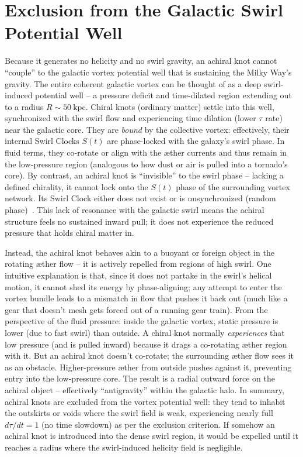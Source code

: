 \section*{Exclusion from the Galactic Swirl Potential Well}

Because it generates no helicity and no swirl gravity, an achiral knot cannot “couple” to the galactic vortex potential well that is sustaining the Milky Way’s gravity. The entire coherent galactic vortex can be thought of as a deep swirl-induced potential well – a pressure deficit and time-dilated region extending out to a radius $R \sim 50~\text{kpc}$. Chiral knots (ordinary matter) settle into this well, synchronized with the swirl flow and experiencing time dilation (lower $\tau$ rate) near the galactic core. They are \textit{bound} by the collective vortex: effectively, their internal Swirl Clocks $S(t)$ are phase-locked with the galaxy’s swirl phase. In fluid terms, they co-rotate or align with the æther currents and thus remain in the low-pressure region (analogous to how dust or air is pulled into a tornado’s core). By contrast, an achiral knot is “invisible” to the swirl phase – lacking a defined chirality, it cannot lock onto the $S(t)$ phase of the surrounding vortex network. Its Swirl Clock either does not exist or is unsynchronized (random phase)~\cite{iskandarani2025vam1}. This lack of resonance with the galactic swirl means the achiral structure feels no sustained inward pull; it does not experience the reduced pressure that holds chiral matter in.


Instead, the achiral knot behaves akin to a buoyant or foreign object in the rotating æther flow – it is actively repelled from regions of high swirl. One intuitive explanation is that, since it does not partake in the swirl’s helical motion, it cannot shed its energy by phase-aligning; any attempt to enter the vortex bundle leads to a mismatch in flow that pushes it back out (much like a gear that doesn’t mesh gets forced out of a running gear train). From the perspective of the fluid pressure: inside the galactic vortex, static pressure is lower (due to fast swirl) than outside. A chiral knot normally \textit{experiences} that low pressure (and is pulled inward) because it drags a co-rotating æther region with it. But an achiral knot doesn’t co-rotate; the surrounding æther flow sees it as an obstacle. Higher-pressure æther from outside pushes against it, preventing entry into the low-pressure core. The result is a radial outward force on the achiral object – effectively “antigravity” within the galactic halo. In summary, achiral knots are excluded from the vortex potential well: they tend to inhabit the outskirts or voids where the swirl field is weak, experiencing nearly full $d\tau/dt=1$ (no time slowdown) as per the exclusion criterion. If somehow an achiral knot is introduced into the dense swirl region, it would be expelled until it reaches a radius where the swirl-induced helicity field is negligible.


